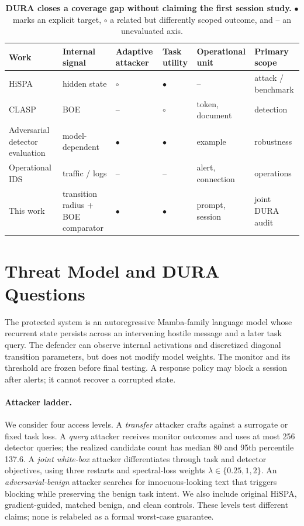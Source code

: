 \documentclass[sigconf]{acmart}
\newcommand{\fullmark}{\ensuremath{\bullet}}
\newcommand{\partialmark}{\ensuremath{\circ}}
\begin{document}
\begin{table}[t]
\caption{\textbf{DURA closes a coverage gap without claiming the first session
study.} \fullmark{} marks an explicit target, \partialmark{} a related but
differently scoped outcome, and -- an unevaluated axis.}
\label{tab:positioning}
\centering\small
\begin{tabularx}{\textwidth}{@{}lYYYYY@{}}
\toprule
Work & Internal signal & Adaptive attacker & Task utility & Operational unit & Primary scope \\
\midrule
HiSPA \cite{lemercier2026hispa} & hidden state & \partialmark & \fullmark & -- & attack / benchmark \\
CLASP \cite{lemercier2026clasp} & BOE & -- & \partialmark & token, document & detection \\
Adversarial detector evaluation \cite{carlini2017detectors,athalye2018obfuscated} & model-dependent & \fullmark & \fullmark & example & robustness \\
Operational IDS \cite{alahmadi2022falsepositives,piet2023ssh} & traffic / logs & -- & -- & alert, connection & operations \\
This work & transition radius + BOE comparator & \fullmark & \fullmark & prompt, session & joint DURA audit \\
\bottomrule
\end{tabularx}
\end{table}

\section{Threat Model and DURA Questions}
The protected system is an autoregressive Mamba-family language model whose
recurrent state persists across an intervening hostile message and a later task
query. The defender can observe internal activations and discretized diagonal
transition parameters, but does not modify model weights. The monitor and its
threshold are frozen before final testing. A response policy may block a
session after alerts; it cannot recover a corrupted state.

\paragraph{Attacker ladder.}
We consider four access levels. A \emph{transfer} attacker crafts against a
surrogate or fixed task loss. A \emph{query} attacker receives monitor outcomes
and uses at most 256 detector queries; the realized candidate count has median
80 and 95th percentile 137.6. A \emph{joint white-box} attacker differentiates
through task and detector objectives, using three restarts and spectral-loss
weights $\lambda\in\{0.25,1,2\}$. An \emph{adversarial-benign} attacker searches
for innocuous-looking text that triggers blocking while preserving the benign
task intent. We also include original HiSPA, gradient-guided, matched benign,
and clean controls. These levels test different claims; none is relabeled as a
formal worst-case guarantee.
\end{document}
